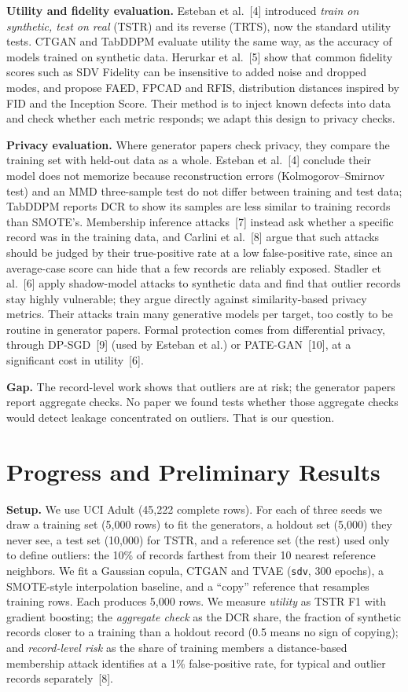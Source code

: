 \documentclass[11pt]{article}
\begin{document}
\textbf{Utility and fidelity evaluation.} Esteban et al.~[4] introduced \emph{train on synthetic, test on real} (TSTR) and its reverse (TRTS), now the standard utility tests. CTGAN and TabDDPM evaluate utility the same way, as the accuracy of models trained on synthetic data. Herurkar et al.~[5] show that common fidelity scores such as SDV Fidelity can be insensitive to added noise and dropped modes, and propose FAED, FPCAD and RFIS, distribution distances inspired by FID and the Inception Score. Their method is to inject known defects into data and check whether each metric responds; we adapt this design to privacy checks.

\textbf{Privacy evaluation.} Where generator papers check privacy, they compare the training set with held-out data as a whole. Esteban et al.~[4] conclude their model does not memorize because reconstruction errors (Kolmogorov--Smirnov test) and an MMD three-sample test do not differ between training and test data; TabDDPM reports DCR to show its samples are less similar to training records than SMOTE's. Membership inference attacks~[7] instead ask whether a specific record was in the training data, and Carlini et al.~[8] argue that such attacks should be judged by their true-positive rate at a low false-positive rate, since an average-case score can hide that a few records are reliably exposed. Stadler et al.~[6] apply shadow-model attacks to synthetic data and find that outlier records stay highly vulnerable; they argue directly against similarity-based privacy metrics. Their attacks train many generative models per target, too costly to be routine in generator papers. Formal protection comes from differential privacy, through DP-SGD~[9] (used by Esteban et al.) or PATE-GAN~[10], at a significant cost in utility~[6].

\textbf{Gap.} The record-level work shows that outliers are at risk; the generator papers report aggregate checks. No paper we found tests whether those aggregate checks would detect leakage concentrated on outliers. That is our question.

\section*{Progress and Preliminary Results}

\textbf{Setup.} We use UCI Adult (45,222 complete rows). For each of three seeds we draw a training set (5,000 rows) to fit the generators, a holdout set (5,000) they never see, a test set (10,000) for TSTR, and a reference set (the rest) used only to define outliers: the 10\% of records farthest from their 10 nearest reference neighbors. We fit a Gaussian copula, CTGAN and TVAE (\texttt{sdv}, 300 epochs), a SMOTE-style interpolation baseline, and a ``copy'' reference that resamples training rows. Each produces 5,000 rows. We measure \emph{utility} as TSTR F1 with gradient boosting; the \emph{aggregate check} as the DCR share, the fraction of synthetic records closer to a training than a holdout record (0.5 means no sign of copying); and \emph{record-level risk} as the share of training members a distance-based membership attack identifies at a 1\% false-positive rate, for typical and outlier records separately~[8].
\end{document}
